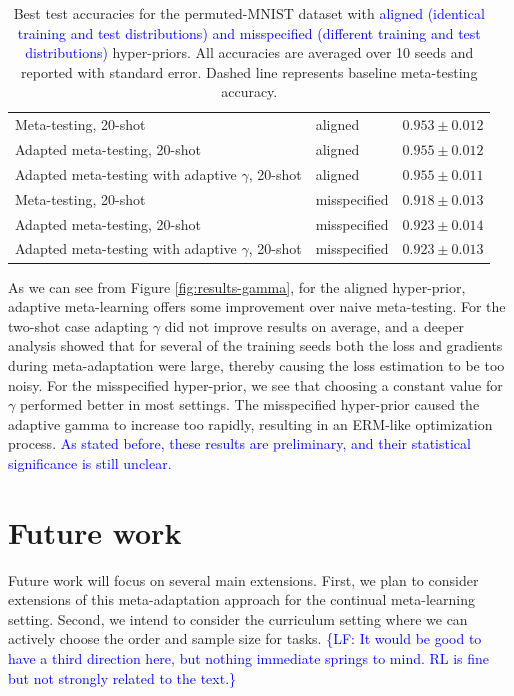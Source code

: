 \documentclass{article}
\theoremstyle{definition}
\newcommand{\LF}[1]{\textcolor{blue}{\{LF: #1\}}}
\newcommand{\LFe}[1]{\textcolor{blue}{#1}}
\begin{document}
\begin{table}
\begin{tabular}{lll}
		Meta-testing, 20-shot & aligned   & $0.953\pm 0.012 $      \\
		Adapted meta-testing, 20-shot & aligned   & $0.955\pm 0.012$      \\
		Adapted meta-testing with adaptive $\gamma$, 20-shot & aligned   & $0.955\pm 0.011$      \\
		\midrule
		Meta-testing, 20-shot & misspecified   & $0.918\pm 0.013 $      \\
		Adapted meta-testing, 20-shot & misspecified   & $0.923\pm 0.014$      \\
		Adapted meta-testing with adaptive $\gamma$, 20-shot & misspecified   & $0.923\pm 0.013$    \\
		\midrule
		\bottomrule
	\end{tabular}
	\caption{Best test accuracies for the permuted-MNIST dataset with \LFe{aligned (identical training and test distributions) and misspecified (different training and test distributions)} hyper-priors. All accuracies are averaged over 10 seeds and reported with standard error. Dashed line represents baseline meta-testing accuracy.}
	\label{table:gamma}
\end{table}


As we can see from Figure \ref{fig:results-gamma}, for the aligned hyper-prior, adaptive meta-learning offers some improvement over naive meta-testing. For the two-shot case adapting $\gamma$ did not improve results on average, and a deeper analysis showed that for several of the training seeds both the loss and gradients during meta-adaptation were large, thereby causing the loss estimation to be too noisy. 
For the misspecified hyper-prior, we see that choosing a constant value for $\gamma$ performed better in most settings. The misspecified hyper-prior caused the adaptive gamma to increase too rapidly, resulting in an ERM-like optimization process.
\LFe{As stated before, these results are preliminary, and their statistical significance is still unclear.}

\section{Future work}

Future work will focus on several main extensions. First, we plan to consider extensions of this meta-adaptation approach for the continual meta-learning setting. Second, we intend to consider the curriculum setting where we can actively choose the order and sample size for tasks. \LF{It would be good to have a third direction here, but nothing immediate springs to mind. RL is fine but not strongly related to the text.}
\end{document}
